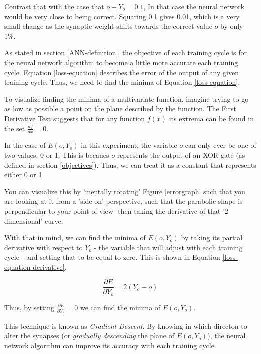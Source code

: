 \documentclass[12pt]{article}
\begin{document}
        Contrast that with the case that $o - Y_o = 0.1$, In that case the neural network would be very close to being correct. Squaring 0.1 gives 0.01, which is a very small change as the synaptic weight shifts towards the correct value $o$ by only 1\%.

        As stated in section \ref{ANN-definition}, the objective of each training cycle is for the neural network algorithm to become a little more accurate each training cycle. Equation \ref{loss-equation} describes the error of the output of any given training cycle. Thus, we need to find the minima of Equation \ref{loss-equation}.
        
        To visualize finding the minima of a multivariate function, imagine trying to go as low as possible a point on the plane described by the function. The First Derivative Test suggests that for any function $f(x)$ its extrema can be found in the set $\frac{df}{dx} = 0$. 

        In the case of \(E(o, Y_o)\) in this experiment, the variable $o$ can only ever be one of two values: 0 or 1. This is becaues $o$ represents the output of an XOR gate (as defined in section \ref{objectives}). Thus, we can treat it as a constant that represents either 0 or 1.

        You can visualize this by 'mentally rotating' Figure \ref{errorgraph} such that you are looking at it from a 'side on' perspective, such that the parabolic shape is perpendicular to your point of view- then taking the derivative of that '2 dimensional' curve.
        
        With that in mind, we can find the minima of $E(o, Y_o)$ by taking its partial derivative with respect to $Y_o$ - the variable that will adjust with each training cycle -  and setting that to be equal to zero. This is shown in Equation \ref{loss-equation-derivative}. 

        \begin{equation} \label{loss-equation-derivative}
            \frac{\partial E}{\partial Y_o} = 2 (Y_o  - o)
        \end{equation}

        Thus, by setting $\frac{\partial E}{\partial Y_o} = 0$ we can find the minima of $E(o, Y_o)$.

        This technique is known as \textit{Gradient Descent}. By knowing in which directon to alter the synapses (or \textit{gradually descending} the plane of $E(o, Y_o)$), the neural network algorithm can improve its accuracy with each training cycle.
\end{document}
